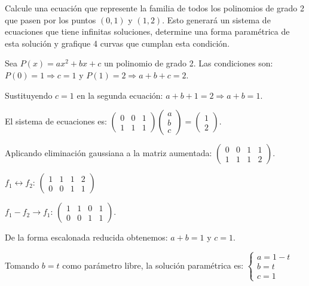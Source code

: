 \begin{prob}\label{problemapolinomios}
Calcule una ecuación que represente la familia de todos los polinomios de grado 2 que pasen por los puntos $(0,1)$ y $(1,2).$ Esto generará un sistema de ecuaciones que tiene infinitas soluciones, determine una forma paramétrica de esta solución y grafique 4 curvas que cumplan esta condición.

\begin{myproof}
Sea $P(x) = ax^2 + bx + c$ un polinomio de grado 2. Las condiciones son: $P(0) = 1 \Rightarrow c = 1$ y $P(1) = 2 \Rightarrow a + b + c = 2.$

Sustituyendo $c = 1$ en la segunda ecuación: $a + b + 1 = 2 \Rightarrow a + b = 1.$

El sistema de ecuaciones es: $\begin{pmatrix}
0 & 0 & 1 \\
1 & 1 & 1
\end{pmatrix}
\begin{pmatrix}
a \\ b \\ c
\end{pmatrix} = 
\begin{pmatrix}
1 \\ 2
\end{pmatrix}.$

Aplicando eliminación gaussiana a la matriz aumentada: $\left(\begin{array}{ccc|c}
0 & 0 & 1 & 1 \\
1 & 1 & 1 & 2
\end{array}\right).$

$f_1 \leftrightarrow f_2$: $\left(\begin{array}{ccc|c}
1 & 1 & 1 & 2 \\
0 & 0 & 1 & 1
\end{array}\right)$

$f_1 - f_2 \rightarrow f_1$: $\left(\begin{array}{ccc|c}
1 & 1 & 0 & 1 \\
0 & 0 & 1 & 1
\end{array}\right).$

De la forma escalonada reducida obtenemos: $a + b = 1$ y $c = 1.$

Tomando $b = t$ como parámetro libre, la solución paramétrica es: $\begin{cases}
a = 1 - t \\
b = t \\
c = 1
\end{cases}$


\end{myproof}
\end{prob}
